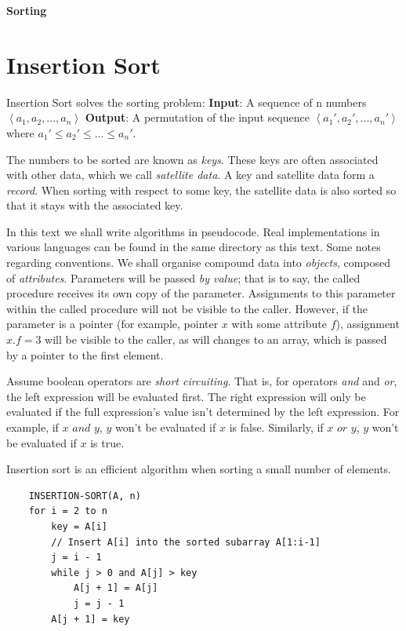 \documentclass[12pt]{article}
\begin{document}
\begin{center}\LARGE\bf
    Sorting
\end{center}

\section{Insertion Sort}
Insertion Sort solves the sorting problem:
\newline\textbf{Input}: A sequence of n numbers $\left\langle a_1, a_2, ..., a_n\right\rangle$
\newline\textbf{Output}: A permutation of the input sequence $\left\langle a_1', a_2', ..., a_n' \right\rangle$ where $a_1' \leq  a_2' \leq ... \leq a_n'$.

The numbers to be sorted are known as \textit{keys}. These keys are often associated with other data, which we call \textit{satellite data}. A
key and satellite data form a \textit{record}. When sorting with respect to some key, the satellite data is also sorted so that it stays with the associated
key.

In this text we shall write algorithms in pseudocode. Real implementations in various languages can be found in the same directory as this text.
Some notes regarding conventions. We shall organise compound data into \textit{objects}, composed of \textit{attributes}. Parameters
will be passed \textit{by value}; that is to say, the called procedure receives its own copy of the parameter. Assignments to this parameter
within the called procedure will not be visible to the caller. However, if the parameter is a pointer (for example, pointer $x$ with some
attribute $f$), assignment $x.f = 3$ will be visible to the caller, as will changes to an array, which is passed by a pointer to the first element.

Assume boolean operators are \textit{short circuiting}. That is, for operators \textit{and} and \textit{or}, the left expression will be
evaluated first. The right expression will only be evaluated if the full expression's value isn't determined by
the left expression. For example, if $x \textit{ and } y$, $y$ won't be evaluated if $x$ is false. Similarly, if
$x \textit{ or } y$, $y$ won't be evaluated if $x$ is true.

Insertion sort is an efficient algorithm when sorting a small number of elements.
\begin{lstlisting}
    INSERTION-SORT(A, n)
    for i = 2 to n
        key = A[i]
        // Insert A[i] into the sorted subarray A[1:i-1]
        j = i - 1
        while j > 0 and A[j] > key
            A[j + 1] = A[j]
            j = j - 1
        A[j + 1] = key
\end{lstlisting}
\end{document}
